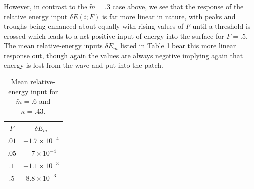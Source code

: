\documentclass[a4paper,11pt]{article}
\begin{document}
However, in contrast to the $\tilde{m}=.3$ case above, we see that the response of the relative energy input $\delta E(t;F)$ is far more linear in nature, with peaks and troughs being enhanced about equally with rising values of $F$ until a threshold is crossed which leads to a net positive input of energy into the surface for $F=.5$.  The mean relative-energy inputs $\delta E_{m}$ listed in Table \ref{tab:midsolmean} bear this more linear response out, though again the values are always negative implying again that energy is lost from the wave and put into the patch.  
\begin{table}
\centering
\begin{tabular}{c|c}
$F$ & $\delta E_{m}$ \\
\hline
$.01$ & $-1.7\times 10^{-4}$\\
$.05$ & $-7\times 10^{-4}$\\
$.1$ & $-1.1\times 10^{-3}$\\
$.5$ & $8.8\times 10^{-3}$
\end{tabular}
\caption{Mean relative-energy input for $\tilde{m}=.6$ and $\kappa=.43$.}
\label{tab:midsolmean}
\end{table}
\end{document}
